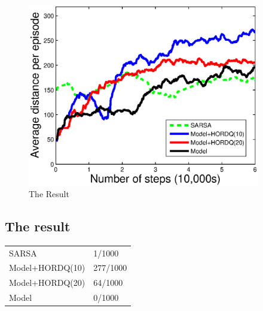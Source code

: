 \begin{figure}[t]
 \begin{minipage}[b]{1.0\linewidth}
    \begin{center}
    \includegraphics[width=4.0in] {./figures/1247.eps}
\end{center}
\end{minipage}

\caption{The Result}
\label{fig:MarioExp}
\end{figure}


\subsection{The result}
\begin{table}
\begin{tabular}[h]{l|l}
\hline
\hline
SARSA    & 1/1000\\
Model+HORDQ(10)    & 277/1000\\
Model+HORDQ(20)     & 64/1000\\
Model        & 0/1000\\
\hline


\hline
\end{tabular}
\end{table}

